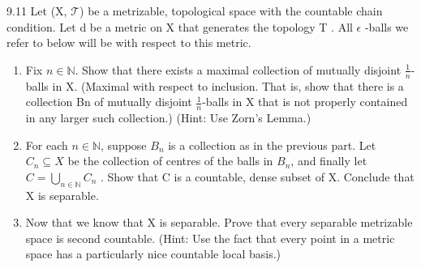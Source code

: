 \documentclass{article}
\newcommand*{\T}{\mathcal{T}}
\newcommand*{\subeq}{\subseteq}
\newcommand{\N}{\mathbb{N}}
\begin{document}
\bigskip

\begin{claim}{9.11}\label{Claim 9.11.}
    Let (X, $\T$) be a metrizable, topological space with the countable chain condition. Let d be a metric on X that generates the topology T . All $\epsilon$ -balls we refer to below will be with respect to this metric.

    \begin{enumerate}
        \item Fix $n \in \N$. Show that there exists a maximal collection of mutually disjoint $\frac{1}{n}$-balls in X. (Maximal with respect to inclusion. That is, show that there is a collection Bn of mutually disjoint $\frac{1}{n}$-balls in X that is not properly contained in any larger such collection.)
        (Hint: Use Zorn's Lemma.)
        \item For each $n \in \N$, suppose $B_n$ is a collection as in the previous part. Let $C_n \subeq X$ be the collection of centres of the balls in $B_n$, and finally let $C = \bigcup_{n \in \N}C_n$ . Show that C is a countable, dense subset of X. Conclude that X is separable.
        \item Now that we know that X is separable. Prove that every separable metrizable space is second countable. (Hint: Use the fact that every point in a metric space has a particularly nice countable local basis.)
    \end{enumerate}
    
\end{claim}
\end{document}
